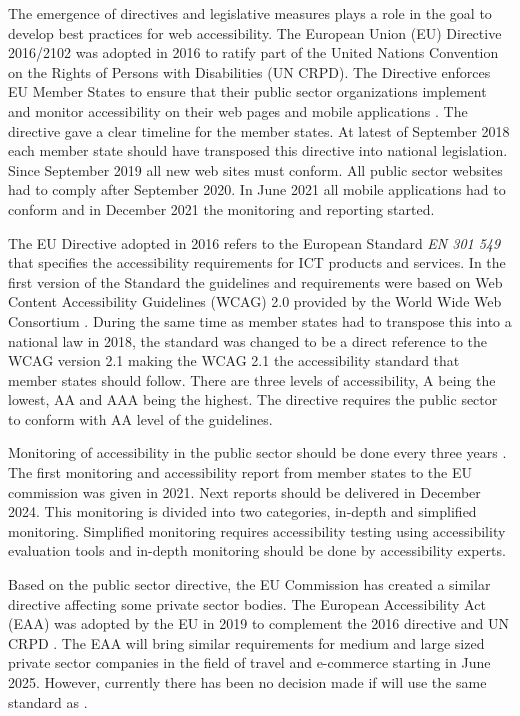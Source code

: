 The emergence of directives and legislative measures plays a role in the goal to develop best practices for web accessibility. The European Union (EU) Directive 2016/2102 was adopted in 2016 to ratify part of the United Nations Convention on the Rights of Persons with Disabilities (UN CRPD). The Directive enforces EU Member States to ensure that their public sector organizations implement and monitor accessibility on their web pages and mobile applications \citep{eudirective2016}. The directive gave a clear timeline for the member states. At latest of September 2018 each member state should have transposed this directive into national legislation. Since September 2019 all new web sites must conform. All public sector websites had to comply after September 2020. In June 2021 all mobile applications had to conform and in December 2021 the monitoring and reporting started. 

The EU Directive adopted in 2016 refers to the European Standard \textit{EN 301 549} that specifies the accessibility requirements for ICT products and services. In the first version of the Standard the guidelines and requirements were based on Web Content Accessibility Guidelines (WCAG) 2.0 provided by the World Wide Web Consortium \citep{wcagadoptioneurope}. During the same time as member states had to transpose this into a national law in 2018, the standard was changed to be a direct reference to the WCAG version 2.1 making the WCAG 2.1 the accessibility standard that member states should follow. There are three levels of accessibility, A being the lowest, AA and AAA being the highest. The directive requires the public sector to conform with AA level of the guidelines.

Monitoring of accessibility in the public sector should be done every three years \citep{eudirectivemonitoring}. The first monitoring and accessibility report from member states to the EU commission was given in 2021. Next reports should be delivered in December 2024. This monitoring is divided into two categories, in-depth and simplified monitoring. Simplified monitoring requires accessibility testing using accessibility evaluation tools and in-depth monitoring should be done by accessibility experts. 

Based on the public sector directive, the EU Commission has created a similar directive affecting some private sector bodies. The European Accessibility Act (EAA) was adopted by the EU in 2019 to complement the 2016 directive and UN CRPD \citep{eudirective2019}. The EAA will bring similar requirements for medium and large sized private sector companies in the field of travel and e-commerce starting in June 2025. However, currently there has been no decision made if \cite{eudirective2019} will use the same standard as \cite{eudirective2016}.


